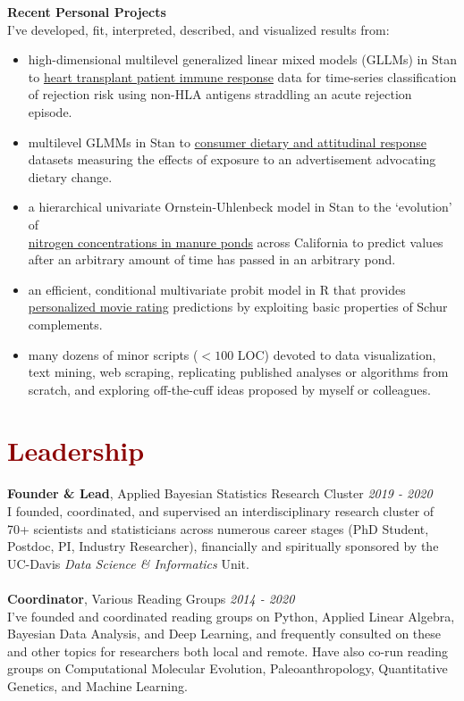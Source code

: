 \documentclass[11pt,margin,line]{resume}
\begin{document}
\begin{resume}
\textbf{Recent Personal Projects}\\
I've developed, fit, interpreted, described, and visualized results from:
\begin{itemize}[noitemsep]
\item high-dimensional multilevel generalized linear mixed models (GLLMs) in Stan to \ul{heart transplant patient immune response} data for time-series classification of rejection risk using non-HLA antigens straddling an acute rejection episode.
\item multilevel GLMMs in Stan to \ul{consumer dietary and attitudinal response} datasets measuring the effects of exposure to an advertisement advocating dietary change.
\item a hierarchical univariate Ornstein-Uhlenbeck model in Stan to the `evolution' of \\\ul{nitrogen concentrations in manure ponds} across California to predict values after an arbitrary amount of time has passed in an arbitrary pond.
\item an efficient, conditional multivariate probit model in R that provides \ul{personalized movie rating} predictions by exploiting basic properties of Schur complements.
\item many dozens of minor scripts ($<100$ LOC) devoted to data visualization, text mining, web scraping, replicating published analyses or algorithms from scratch, and exploring off-the-cuff ideas proposed by myself or colleagues.
\end{itemize}
\vspace{-1.5mm}

\section{\large\textcolor{DarkRed}{Leadership}}

\textbf{Founder \& Lead}, Applied Bayesian Statistics Research Cluster \hfill \emph{2019 - 2020}\\
I founded, coordinated, and supervised an interdisciplinary research cluster of 70+ scientists and statisticians across numerous career stages (PhD Student, Postdoc, PI, Industry Researcher), financially and spiritually sponsored by the UC-Davis \emph{Data Science \& Informatics} Unit.\\\\
\textbf{Coordinator}, Various Reading Groups \hfill \emph{2014 - 2020}\\
I've founded and coordinated reading groups on Python, Applied Linear Algebra, Bayesian Data Analysis, and Deep Learning, and frequently consulted on these and other topics for researchers both local and remote. Have also co-run reading groups on Computational Molecular Evolution, Paleoanthropology, Quantitative Genetics, and Machine Learning.
\vspace{-1.5mm}


\end{resume}
\end{document}
